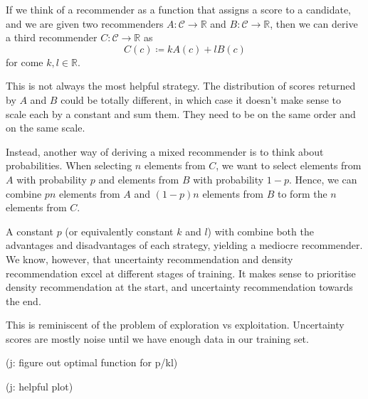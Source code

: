 \documentclass[11pt,twoside]{report}
\newcommand\bbR{\mathbb{R}}
\newcommand\cC{\mathcal{C}}
\newcommand\jakub[1]{{\color{red}(j: #1)}}
\begin{document}
If we think of a recommender as a function that assigns a score to a candidate, and we are given two recommenders $A : \cC \to \bbR$ and $B : \cC \to \bbR$, then we can derive a third recommender $C : \cC \to \bbR$ as \[
    C(c) \coloneqq kA(c) + lB(c)
\] for come $k, l \in \bbR$.

This is not always the most helpful strategy. The distribution of scores returned by $A$ and $B$ could be totally different, in which case it doesn't make sense to scale each by a constant and sum them. They need to be on the same order and on the same scale.

Instead, another way of deriving a mixed recommender is to think about probabilities. When selecting $n$ elements from $C$, we want to select elements from $A$ with probability $p$ and elements from $B$ with probability $1-p$. Hence, we can combine $pn$ elements from $A$ and $(1-p)n$ elements from $B$ to form the $n$ elements from $C$.

A constant $p$ (or equivalently constant $k$ and $l$) with combine both the advantages and disadvantages of each strategy, yielding a mediocre recommender. We know, however, that uncertainty recommendation and density recommendation excel at different stages of training. It makes sense to prioritise density recommendation at the start, and uncertainty recommendation towards the end.

This is reminiscent of the problem of exploration vs exploitation. Uncertainty scores are mostly noise until we have enough data in our training set.

\jakub{figure out optimal function for p/kl}

\jakub{helpful plot}

{}

\end{document}
